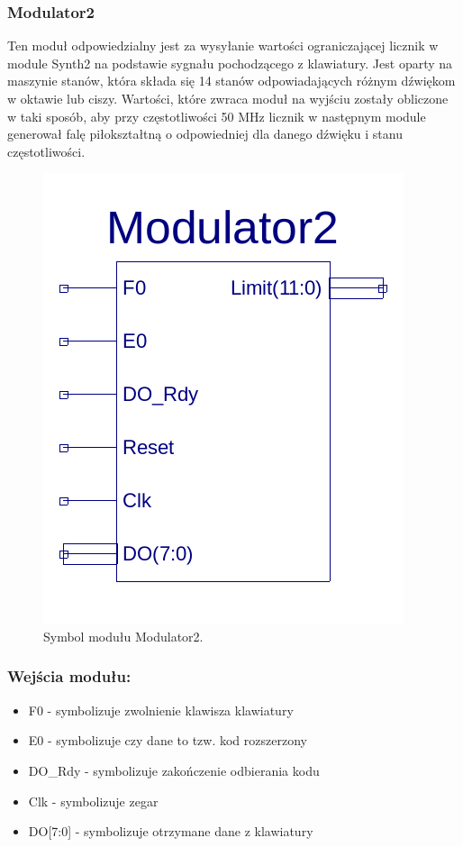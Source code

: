 \documentclass[a4paper,11pt]{article}
\begin{document}
\subsubsection{Modulator2}
Ten moduł odpowiedzialny jest za wysyłanie wartości ograniczającej licznik w module Synth2 na podstawie sygnału pochodzącego z klawiatury. Jest oparty na maszynie stanów, która składa się 14 stanów odpowiadających różnym dźwiękom w oktawie lub ciszy. Wartości, które zwraca moduł na wyjściu zostały obliczone w taki sposób, aby przy częstotliwości 50 MHz licznik w następnym module generował falę piłokształtną o odpowiedniej dla danego dźwięku i stanu częstotliwości.

\begin{figure}[H]
\center
\includegraphics[scale=0.5]{modulatorSymb.png}
\caption{Symbol modułu Modulator2.}
\end{figure}

\subsubsection*{Wejścia modułu:}
\begin{itemize}
\item F0 - symbolizuje zwolnienie klawisza klawiatury
\item E0 - symbolizuje czy dane to tzw. kod rozszerzony
\item DO_Rdy - symbolizuje zakończenie odbierania kodu
\item Clk - symbolizuje zegar
\item DO[7:0] - symbolizuje otrzymane dane z klawiatury
\end{itemize}
\end{document}

